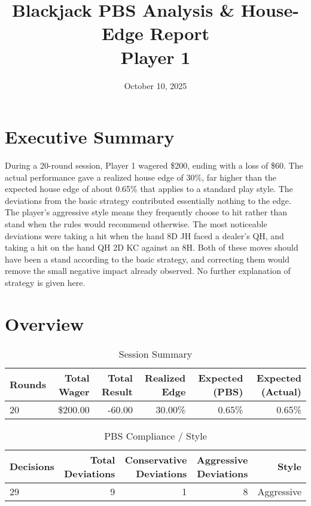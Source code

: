 \documentclass[11pt]{article}
\title{Blackjack PBS Analysis \& House-Edge Report \\ {\large Player 1}}
\date{October 10, 2025}
\begin{document}
\maketitle
\section*{Executive Summary}
During a 20-round session, Player 1 wagered \$200, ending with a loss of \$60. The actual performance gave a realized house edge of 30\%, far higher than the expected house edge of about 0.65\% that applies to a standard play style. The deviations from the basic strategy contributed essentially nothing to the edge. The player’s aggressive style means they frequently choose to hit rather than stand when the rules would recommend otherwise. The most noticeable deviations were taking a hit when the hand 8D JH faced a dealer’s QH, and taking a hit on the hand QH 2D KC against an 8H. Both of these moves should have been a stand according to the basic strategy, and correcting them would remove the small negative impact already observed. No further explanation of strategy is given here.
\section*{Overview}
\begin{table}[ht]
\centering
\caption{Session Summary}
\label{tab:session_p1}
\begin{tabular}{l | r | r | r | r | r}
\hline
Rounds & Total Wager & Total Result & Realized Edge & Expected (PBS) & Expected (Actual) \\ \hline
20 & \$200.00 & -60.00 & 30.00\% & 0.65\% & 0.65\% \\
\hline
\end{tabular}
\end{table}
\begin{table}[ht]
\centering
\caption{PBS Compliance / Style}
\label{tab:style_p1}
\begin{tabular}{l | r | r | r | r}
\hline
Decisions & Total Deviations & Conservative Deviations & Aggressive Deviations & Style \\ \hline
29 & 9 & 1 & 8 & Aggressive \\
\hline
\end{tabular}
\end{table}
\end{document}
